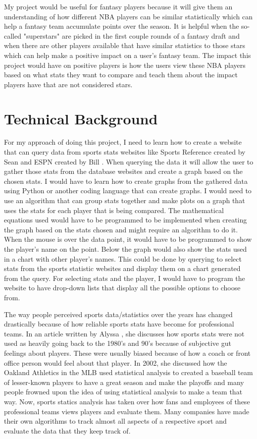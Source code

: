 \documentclass[10pt,twocolumn]{article}
\begin{document}
My project would be useful for fantasy players because it will give them an understanding of how different NBA players can be similar statistically which can help a fantasy team accumulate points over the season. It is helpful when the so-called "superstars" are picked in the first couple rounds of a fantasy draft and when there are other players available that have similar statistics to those stars which can help make a positive impact on a user's fantasy team. The impact this project would have on positive players is how the users view these NBA players based on what stats they want to compare and teach them about the impact players have that are not considered stars. 


\section{Technical Background}


For my approach of doing this project, I need to learn how to create a website that can query data from sports stats websites like Sports Reference created by Sean \textcite{sportsReference} and ESPN created by Bill \textcite{espn}. When querying the data it will allow the user to gather those stats from the database websites and create a graph based on the chosen stats. I would have to learn how to create graphs from the gathered data using Python or another coding language that can create graphs. I would need to use an algorithm that can group stats together and make plots on a graph that uses the stats for each player that is being compared. The mathematical equations used would have to be programmed to be implemented when creating the graph based on the stats chosen and might require an algorithm to do it. When the mouse is over the data point, it would have to be programmed to show the player's name on the point. Below the graph would also show the stats used in a chart with other player's names. This could be done by querying to select stats from the sports statistic websites and display them on a chart generated from the query. For selecting stats and the player, I would have to program the website to have drop-down lists that display all the possible options to choose from.

The way people perceived sports data/statistics over the years has changed drastically because of how reliable sports stats have become for professional teams. In an article written by Alyssa \textcite{sportsStats}, she discusses how sports stats were not used as heavily going back to the 1980's and 90's because of subjective gut feelings about players. These were usually biased because of how a coach or front office person would feel about that player. In 2002, she discussed how the Oakland Athletics in the MLB used statistical analysis to created a baseball team of lesser-known players to have a great season and make the playoffs and many people frowned upon the idea of using statistical analysis to make a team that way. Now, sports statics analysis has taken over how fans and employees of these professional teams views players and evaluate them. Many companies have made their own algorithms to track almost all aspects of a respective sport and evaluate the data that they keep track of. 
\end{document}
